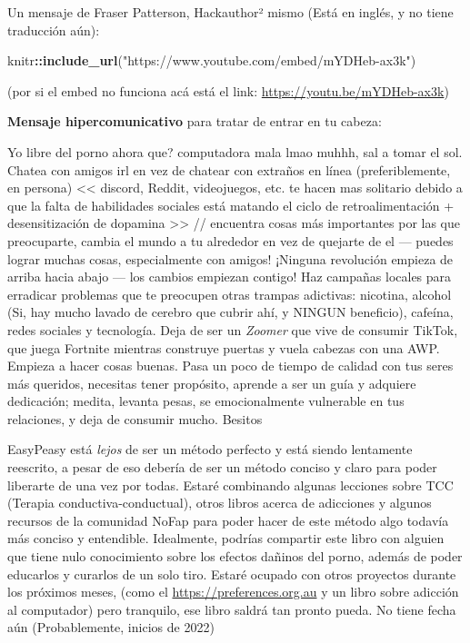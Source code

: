 \documentclass[
  spanish,
  openany]{book}
\newenvironment{Shaded}{\begin{snugshade}}{\end{snugshade}}
\newcommand{\KeywordTok}[1]{\textcolor[rgb]{0.13,0.29,0.53}{\textbf{#1}}}
\newcommand{\NormalTok}[1]{#1}
\newcommand{\OperatorTok}[1]{\textcolor[rgb]{0.81,0.36,0.00}{\textbf{#1}}}
\newcommand{\StringTok}[1]{\textcolor[rgb]{0.31,0.60,0.02}{#1}}
\let\oldurl\url
\renewcommand\url{\renewcommand\UrlFont{\ttfamily\color{linkcolor}}\oldurl}
\begin{document}
Un mensaje de Fraser Patterson, Hackauthor² mismo (Está en inglés, y no tiene traducción aún):

\begin{Shaded}
\begin{Highlighting}[]
\NormalTok{knitr}\OperatorTok{::}\KeywordTok{include\_url}\NormalTok{(}\StringTok{"https://www.youtube.com/embed/mYDHeb{-}ax3k"}\NormalTok{)}
\end{Highlighting}
\end{Shaded}

(por si el embed no funciona acá está el link: \url{https://youtu.be/mYDHeb-ax3k})

\textbf{Mensaje hipercomunicativo} para tratar de entrar en tu cabeza:

Yo libre del porno ahora que? \textbar\textbar\textbar{} computadora mala lmao muhhh, sal a tomar el sol. Chatea con amigos irl en vez de chatear con extraños en línea (preferiblemente, en persona) \textless\textless{} discord, Reddit, videojuegos, etc. te hacen mas solitario debido a que la falta de habilidades sociales está matando el ciclo de retroalimentación + desensitización de dopamina \textgreater\textgreater{} // encuentra cosas más importantes por las que preocuparte, cambia el mundo a tu alrededor en vez de quejarte de el --- puedes lograr muchas cosas, especialmente con amigos! ¡Ninguna revolución empieza de arriba hacia abajo --- los cambios empiezan contigo! Haz campañas locales para erradicar problemas que te preocupen \textbar\textbar{} otras trampas adictivas: nicotina, alcohol (Si, hay mucho lavado de cerebro que cubrir ahí, y NINGUN beneficio), cafeína, redes sociales y tecnología. Deja de ser un \emph{Zoomer} que vive de consumir TikTok, que juega Fortnite mientras construye puertas y vuela cabezas con una AWP. Empieza a hacer cosas buenas. Pasa un poco de tiempo de calidad con tus seres más queridos, necesitas tener propósito, aprende a ser un guía y adquiere dedicación; medita, levanta pesas, se emocionalmente vulnerable en tus relaciones, y deja de consumir mucho. Besitos

EasyPeasy está \emph{lejos} de ser un método perfecto y está siendo lentamente reescrito, a pesar de eso debería de ser un método conciso y claro para poder liberarte de una vez por todas. Estaré combinando algunas lecciones sobre TCC (Terapia conductiva-conductual), otros libros acerca de adicciones y algunos recursos de la comunidad NoFap para poder hacer de este método algo todavía más conciso y entendible. Idealmente, podrías compartir este libro con alguien que tiene nulo conocimiento sobre los efectos dañinos del porno, además de poder educarlos y curarlos de un solo tiro. Estaré ocupado con otros proyectos durante los próximos meses, (como el \url{https://preferences.org.au} y un libro sobre adicción al computador) pero tranquilo, ese libro saldrá tan pronto pueda. No tiene fecha aún (Probablemente, inicios de 2022)
\end{document}
